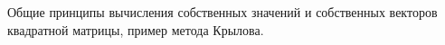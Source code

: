\documentclass[__main__.tex]{subfiles}
\begin{document}
Общие принципы вычисления собственных значений и собственных векторов квадратной матрицы, пример метода Крылова.
\end{document}
